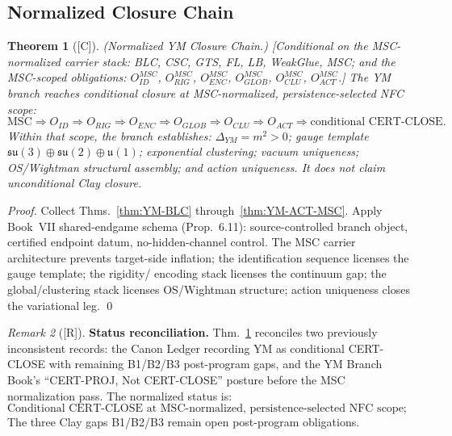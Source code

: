 \documentclass[12pt,oneside]{amsbook}
\theoremstyle{plain}
\newtheorem{theorem}{Theorem}[section]
\theoremstyle{definition}
\theoremstyle{remark}
\newtheorem{remark}[theorem]{Remark}
\newcommand{\status}[1]{\textup{[#1]}}
\begin{document}
\subsection{Normalized Closure Chain}

\begin{theorem}[\status{C}]\label{thm:YM-NC}
\textup{(Normalized YM Closure Chain.)}
\textup{[Conditional on the MSC-normalized carrier stack:
\textup{BLC}, \textup{CSC}, \textup{GTS}, \textup{FL}, \textup{LB},
\textup{WeakGlue}, \textup{MSC}; and the MSC-scoped obligations:
$O_{ID}^{MSC}$, $O_{RIG}^{MSC}$, $O_{ENC}^{MSC}$, $O_{GLOB}^{MSC}$,
$O_{CLU}^{MSC}$, $O_{ACT}^{MSC}$.]}
The YM branch reaches conditional closure at MSC-normalized,
persistence-selected NFC scope:
\[
 \boxed{
 \mathrm{MSC} \Rightarrow O_{ID} \Rightarrow O_{RIG} \Rightarrow
 O_{ENC} \Rightarrow O_{GLOB} \Rightarrow O_{CLU} \Rightarrow
 O_{ACT} \Rightarrow \text{conditional CERT-CLOSE}.
 }
\]
Within that scope, the branch establishes:
$\Delta_{YM} = m^2 > 0$;
gauge template $\mathfrak{su}(3) \oplus \mathfrak{su}(2) \oplus \mathfrak{u}(1)$;
exponential clustering; vacuum uniqueness; OS/Wightman structural assembly;
and action uniqueness.
It does not claim unconditional Clay closure.
\end{theorem}

\begin{proof}
Collect Thms.~\ref{thm:YM-BLC} through~\ref{thm:YM-ACT-MSC}. Apply
Book~VII shared-endgame schema (Prop.~6.11): source-controlled branch
object, certified endpoint datum, no-hidden-channel control. The
MSC carrier architecture prevents target-side inflation; the
identification sequence licenses the gauge template; the rigidity/
encoding stack licenses the continuum gap; the global/clustering stack
licenses OS/Wightman structure; action uniqueness closes the
variational leg.
\qed
\end{proof}

\begin{remark}[\status{R}]\label{rem:YM-NC-status-reconciliation}
\textbf{Status reconciliation.}
Thm.~\ref{thm:YM-NC} reconciles two previously inconsistent records:
the Canon Ledger recording YM as conditional CERT-CLOSE with remaining
B1/B2/B3 post-program gaps, and the YM Branch Book's
``CERT-PROJ, Not CERT-CLOSE'' posture before the MSC normalization
pass. The normalized status is:
\[
 \boxed{\text{Conditional CERT-CLOSE at MSC-normalized,
 persistence-selected NFC scope; not unconditional Clay closure.}}
\]
The three Clay gaps B1/B2/B3 remain open post-program obligations.
\end{remark}
\end{document}
